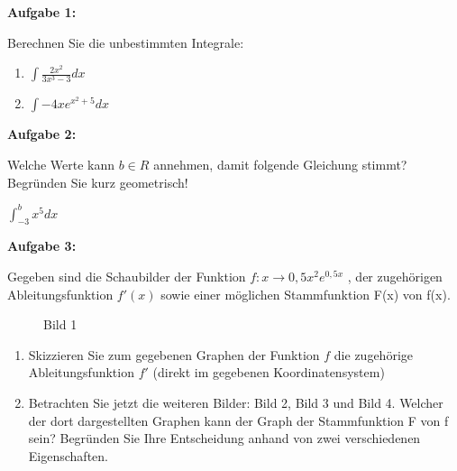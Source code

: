 \documentclass[a4paper,12pt]{article}
\newcommand{\Aufgabe}[1]{
  {
  \vspace*{0.5cm}
  \textsf{\textbf{Aufgabe #1}}
  \vspace*{0.2cm}
  
  }
}
\begin{document}
\Aufgabe{1:}
Berechnen Sie die unbestimmten Integrale:

\begin{enumerate}[label={\alph*)}]
  \item $ \int \frac{2x^2}{3x^3-3} dx $
  \item $ \int -4xe^{x^2+5} dx $
\end{enumerate}
\Aufgabe{2:}
Welche Werte kann $ b \in R$ annehmen, damit folgende Gleichung stimmt? Begründen Sie kurz geometrisch!

 $ \int_ {-3}^{b} x^5 dx $

\Aufgabe{3:}

Gegeben sind die Schaubilder der Funktion $f: x \rightarrow 0,5x^2  e^{0,5x}$ , der zugehörigen Ableitungsfunktion $f'(x)$ sowie einer möglichen Stammfunktion F(x) von f(x).

\begin{figure}[!h]
  \centering
{}
  \label{f1}
  \caption*{Bild 1}
\end{figure}

\begin{enumerate}[label={\alph*)}]
\item Skizzieren Sie zum gegebenen Graphen der Funktion $f$  die zugehörige Ableitungsfunktion $f'$ (direkt im gegebenen Koordinatensystem) 
\item Betrachten Sie jetzt die weiteren Bilder: Bild 2, Bild 3 und Bild 4. Welcher der dort dargestellten Graphen kann der Graph der Stammfunktion F von f sein?
Begründen Sie Ihre Entscheidung anhand von zwei verschiedenen Eigenschaften.

\end{enumerate}
\end{document}
